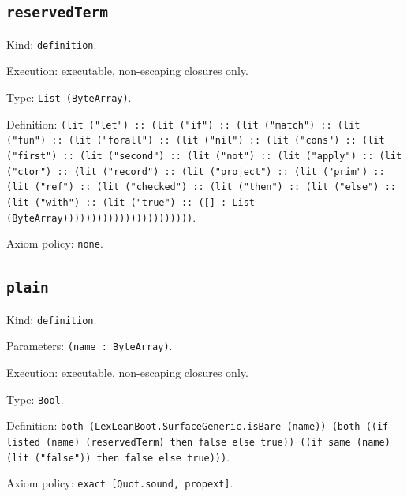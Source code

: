 \documentclass[11pt]{article}
\begin{document}
\subsection*{\texttt{reservedTerm}}
\noindent Kind: \texttt{definition}.\par
\noindent Execution: executable, non-escaping closures only.\par
\noindent Type: \texttt{List (ByteArray)}.\par
\noindent Definition: \texttt{(lit ("let") :: (lit ("if") :: (lit ("match") :: (lit ("fun") :: (lit ("forall") :: (lit ("nil") :: (lit ("cons") :: (lit ("first") :: (lit ("second") :: (lit ("not") :: (lit ("apply") :: (lit ("ctor") :: (lit ("record") :: (lit ("project") :: (lit ("prim") :: (lit ("ref") :: (lit ("checked") :: (lit ("then") :: (lit ("else") :: (lit ("with") :: (lit ("true") :: ([] : List (ByteArray)))))))))))))))))))))))}.\par
\noindent Axiom policy: \texttt{none}.\par
\subsection*{\texttt{plain}}
\noindent Kind: \texttt{definition}.\par
\noindent Parameters: \texttt{(name : ByteArray)}.\par
\noindent Execution: executable, non-escaping closures only.\par
\noindent Type: \texttt{Bool}.\par
\noindent Definition: \texttt{both (LexLeanBoot.SurfaceGeneric.isBare (name)) (both ((if listed (name) (reservedTerm) then false else true)) ((if same (name) (lit ("false")) then false else true)))}.\par
\noindent Axiom policy: \texttt{exact [Quot.sound, propext]}.\par
\end{document}
